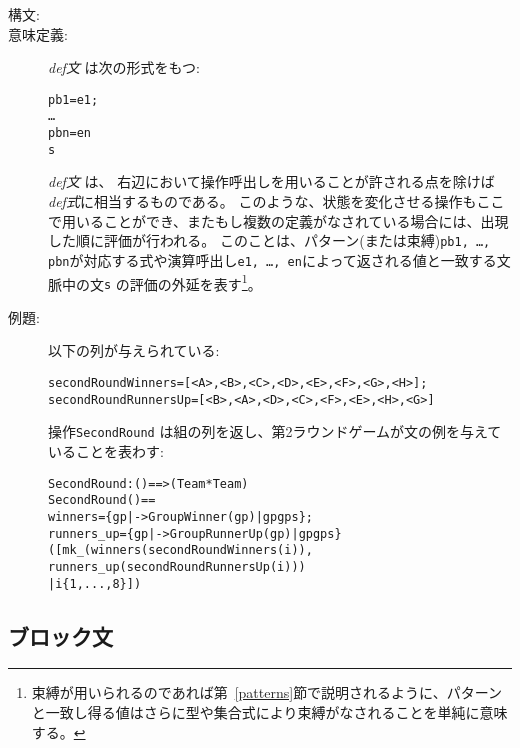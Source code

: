 \documentclass[\pformat,12pt]{jarticle}
\begin{document}
\begin{description}
\item[構文:]



\item[意味定義:] {\it def文} は次の形式をもつ:
  \begin{alltt}
     pb1 = e1;
        \ldots
        pbn = en
      s
  \end{alltt}
  {\it def文} は、 右辺において操作呼出しを用いることが許される点を除けば{\it def式}に相当するものである。 
このような、状態を変化させる操作もここで用いることができ、またもし複数の定義がなされている場合には、出現した順に評価が行われる。 
 このことは、パターン(または束縛){\tt pb1, \ldots, pbn}が対応する式や演算呼出し{\tt e1, \ldots, en}によって返される値と一致する文脈中の文{\tt s} の評価の外延を表す\footnote{束縛が用いられるのであれば第~\ref{patterns}節で説明されるように、パターンと一致し得る値はさらに型や集合式により束縛がなされることを単純に意味する。}。

\item[例題:]  以下の列が与えられている:
  \begin{alltt}
  secondRoundWinners = [<A>,<B>,<C>,<D>,<E>,<F>,<G>,<H>];
  secondRoundRunnersUp = [<B>,<A>,<D>,<C>,<F>,<E>,<H>,<G>]
  \end{alltt}
操作\texttt{SecondRound}%
は組の列を返し、第2ラウンドゲームが文の例を与えていることを表わす:
  \begin{alltt}
  SecondRound : () ==>  (Team * Team)
  SecondRound () ==
   winners = \{ gp |-> GroupWinner(gp) | gp  gps \};
     runners_up = \{ gp |-> GroupRunnerUp(gp) | gp  gps\}
   ([mk_(winners(secondRoundWinners(i)),
                runners_up(secondRoundRunnersUp(i))) 
           | i  \{1,...,8\}])
  \end{alltt}

\end{description}

\subsection{ブロック文} \label{dcl-stmt}
\end{document}
